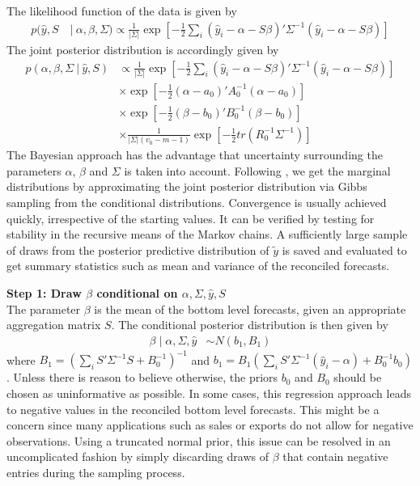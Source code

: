 \documentclass[a4paper,fleqn,11pt]{article}
\begin{document}
The likelihood function of the data is given by
\begin{align*}
p(\hat{y},S\ &|\ \alpha,\beta,\Sigma) \propto \frac{1}{|\Sigma|} \exp\left[-\frac{1}{2} \sum_i (\hat{y}_i - \alpha - S\beta)'\Sigma^{-1}(\hat{y}_i - \alpha - S\beta)\right]
\end{align*}
The joint posterior distribution is accordingly given by
\begin{align*}
p(\alpha,\beta,\Sigma\ |\ \hat{y},S) & \propto \frac{1}{|\Sigma|} \exp\left[-\frac{1}{2} \sum_i (\hat{y}_i - \alpha - S\beta)'\Sigma^{-1}(\hat{y}_i - \alpha - S\beta)\right] \\
&\times \exp \left[-\frac{1}{2}(\alpha - a_0)'A_0^{-1}(\alpha - a_0)\right] \\
&\times \exp \left[-\frac{1}{2}(\beta - b_0)'B_0^{-1}(\beta - b_0)\right] \\
&\times \frac{1}{|\Sigma|(v_0 - m - 1)} \exp \left[-\frac{1}{2} tr(R_0^{-1}\Sigma^{-1}) \right]
\end{align*}
The Bayesian approach has the advantage that uncertainty surrounding the parameters $\alpha$, $\beta$ and $\Sigma$ is taken into account. Following \cite{Percy1992}, we get the marginal distributions by approximating the joint posterior distribution via Gibbs sampling from the conditional distributions. Convergence is usually achieved quickly, irrespective of the starting values. It can be verified by testing for stability in the recursive means of the Markov chains. A sufficiently large sample of draws from the posterior predictive distribution of $\tilde{y}$ is saved and evaluated to get summary statistics such as mean and variance of the reconciled forecasts.

\noindent\textbf{Step 1: Draw $\beta$ conditional on $\alpha,\Sigma,\hat{y},S$}\\
The parameter $\beta$ is the mean of the bottom level forecasts, given an appropriate aggregation matrix $S$. The conditional posterior distribution is then given by
\begin{align}
\beta \mid \alpha,\Sigma,\hat{y} &\sim N(b_1,B_1)
\end{align}
where $B_1 = \left(\sum_i S'\Sigma^{-1}S + B_0^{-1}\right)^{-1}$ and $b_1 = B_1 \left(\sum_i S'\Sigma^{-1} (\hat{y}_i - \alpha) + B_0^{-1}b_0\right)$. Unless there is reason to believe otherwise, the priors $b_0$ and $B_0$ should be chosen as uninformative as possible. In some cases, this regression approach leads to negative values in the reconciled bottom level forecasts. This might be a concern since many applications such as sales or exports do not allow for negative observations. Using a truncated normal prior, this issue can be resolved in an uncomplicated fashion by simply discarding draws of $\beta$ that contain negative entries during the sampling process.
\end{document}
